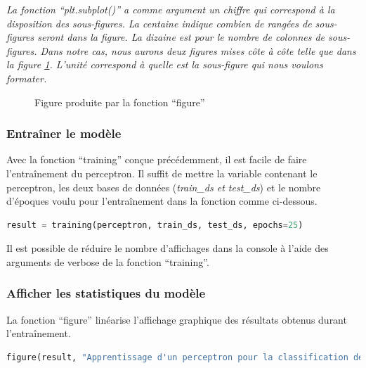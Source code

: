 \documentclass{article}
\begin{document}
\textit{La fonction ``plt.subplot()'' a comme argument un chiffre qui correspond à la disposition des sous-figures. La centaine indique combien de rangées de sous-figures seront dans la figure. La dizaine est pour le nombre de colonnes de sous-figures. Dans notre cas, nous  aurons deux figures mises côte à côte telle que dans la figure \ref{fig:ex_figure}. L'unité correspond à quelle est la sous-figure qui nous voulons formater.}

\begin{figure}[H]
  \centering
  \caption{Figure produite par la fonction ``figure''}
  \label{fig:ex_figure}
\end{figure}

\subsubsection{Entraîner le modèle}
Avec la fonction ``training'' conçue précédemment, il est facile de faire l'entraînement du perceptron. Il suffit de mettre la variable contenant le perceptron, les deux bases de données (\textit{train\_ds et test\_ds}) et le nombre d'époques voulu pour l'entraînement dans la fonction comme ci-dessous.
\smallbreak
\begin{lstlisting}[language=Python, caption={Entraînement du perceptron}, label={code:train_perceptron}]
result = training(perceptron, train_ds, test_ds, epochs=25)
\end{lstlisting}
\medbreak
Il est possible de réduire le nombre d'affichages dans la console à l'aide des arguments de verbose de la fonction ``training''.

\subsubsection{Afficher les statistiques du modèle}
La fonction ``figure'' linéarise l'affichage graphique des résultats obtenus durant l'entraînement.
\smallbreak
\begin{lstlisting}[language=Python, caption={Affichage des résultats de l'entraînement}, label={code:display_perceptron}]
figure(result, "Apprentissage d'un perceptron pour la classification des signaux sonores")
\end{lstlisting}
\end{document}
